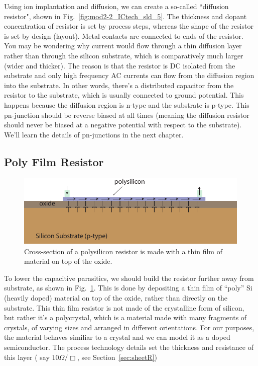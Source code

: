 Using ion implantation and diffusion, we can create a so-called ``diffusion resistor", shown in Fig.~\ref{fig:mod2-2_ICtech_sld_5}.  The thickness and dopant concentration of resistor is set by process steps, whereas the shape of the resistor is set by design (layout).   Metal contacts are connected to ends of the resistor.  You may be wondering why current would flow through a thin diffusion layer rather than through the silicon substrate, which is comparatively much larger (wider and thicker).  The reason is that the resistor is DC isolated from the substrate and only high frequency AC currents can flow from the diffusion region into the substrate.  In other words, there's a distributed capacitor from the resistor to the substrate, which is usually connected to ground potential.  This happens because the diffusion region is n-type and the substrate is p-type.  This pn-junction should be reverse biased at all times (meaning the diffusion resistor should never be biased at a negative potential with respect to the substrate).  We'll learn the details of pn-junctions in the next chapter.
\subsection{Poly Film Resistor}
\begin{figure}[tb]
\begin{center}
\includegraphics[width=.7\columnwidth]{poly_resistor}
\end{center}
\caption{Cross-section of a polysilicon resistor is made with a thin film of material on top of the oxide.}
\label{fig:mod2-2_ICtech_sld_6}
\end{figure}

To lower the capacitive parasitics, we should build the resistor further away from substrate, as shown in Fig.~\ref{fig:mod2-2_ICtech_sld_6}. This is done by depositing a thin film of “poly” Si (heavily doped) material on top of the oxide, rather than directly on the substrate.  This thin film resistor is not made of the crystalline form of silicon, but rather it's a polycrystal, which is a material made with many fragments of crystals, of varying sizes and arranged in different orientations.   For our purposes, the material behaves similiar to a crystal and we can model it as a doped semiconductor.  The process technology details set the thickness and resistance of this layer ( say $10\Omega/\Box$, see Section~\ref{sec:sheetR}) 

